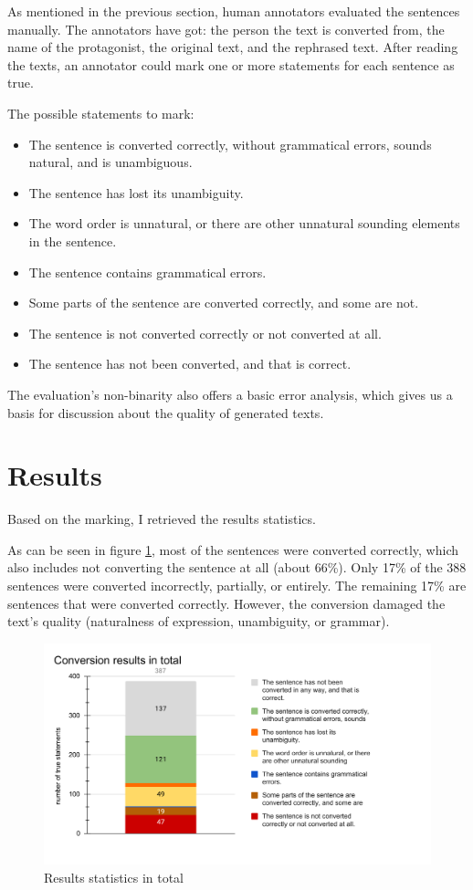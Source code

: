 As mentioned in the previous section, human annotators evaluated the sentences manually. The annotators have got: the person the text is converted from, the name of the protagonist, the original text, and the rephrased text. After reading the texts, an annotator could mark one or more statements for each sentence as true.

The possible statements to mark:

\begin{itemize}
	\item The sentence is converted correctly, without grammatical errors, sounds natural, and is unambiguous.
	\item The sentence has lost its unambiguity.
	\item The word order is unnatural, or there are other unnatural sounding elements in the sentence.
	\item The sentence contains grammatical errors.
	\item Some parts of the sentence are converted correctly, and some are not.
	\item The sentence is not converted correctly or not converted at all.
	\item The sentence has not been converted, and that is correct.
\end{itemize}

The evaluation's non-binarity also offers a basic error analysis, which gives us a basis for discussion about the quality of generated texts.

\section{Results}

Based on the marking, I retrieved the results statistics.

As can be seen in figure \ref{fig:eval-total}, most of the sentences were converted correctly, which also includes not converting the sentence at all (about 66\%). Only 17\% of the 388 sentences were converted incorrectly, partially, or entirely. The remaining 17\% are sentences that were converted correctly. However, the conversion damaged the text's quality (naturalness of expression, unambiguity, or grammar).

\begin{figure}[!ht]
\includegraphics[width=\textwidth]{data/Eval-Total.pdf}
\caption{Results statistics in total}
\label{fig:eval-total}
\end{figure}

